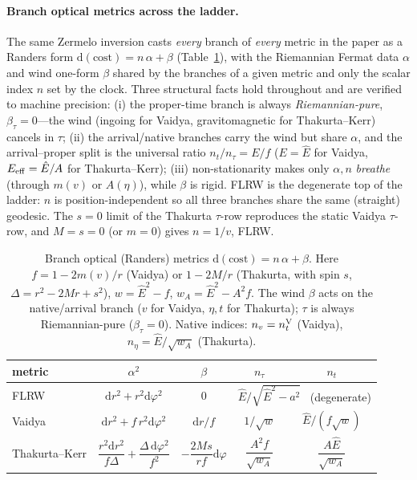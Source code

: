 \documentclass[12pt]{iopart}
\newcommand{\Ehat}{\hat E}
\newcommand{\dd}{\mathrm{d}}
\begin{document}
\paragraph{Branch optical metrics across the ladder.} The same Zermelo inversion
casts \emph{every} branch of \emph{every} metric in the paper as a Randers form
$\dd(\text{cost})=n\,\alpha+\beta$ (Table~\ref{tab:optical}), with the Riemannian
Fermat data $\alpha$ and wind one-form $\beta$ shared by the branches of a given
metric and only the scalar index $n$ set by the clock. Three structural facts
hold throughout and are verified to machine precision: (i) the proper-time branch
is always \emph{Riemannian-pure}, $\beta_\tau=0$---the wind (ingoing for Vaidya,
gravitomagnetic for Thakurta--Kerr) cancels in $\tau$; (ii) the arrival/native
branches carry the wind but share $\alpha$, and the arrival--proper split is the
universal ratio $n_t/n_\tau=E/f$ ($E=\Ehat$ for Vaidya, $E_{\rm eff}=\Ehat/A$ for
Thakurta--Kerr); (iii) non-stationarity makes only $\alpha,n$ \emph{breathe}
(through $m(v)$ or $A(\eta)$), while $\beta$ is rigid. FLRW is the degenerate top
of the ladder: $n$ is position-independent so all three branches share the same
(straight) geodesic. The $s=0$ limit of the Thakurta $\tau$-row reproduces the
static Vaidya $\tau$-row, and $M=s=0$ (or $m=0$) gives $n=1/v$, FLRW.

\begin{table}[ht]
    \centering
    \small
    \caption{Branch optical (Randers) metrics $\dd(\text{cost})=n\,\alpha+\beta$.
    Here $f=1-2m(v)/r$ (Vaidya) or $1-2M/r$ (Thakurta, with spin $s$,
    $\Delta=r^2-2Mr+s^2$), $w=\Ehat^2-f$, $w_A=\Ehat^2-A^2f$. The wind $\beta$
    acts on the native/arrival branch ($v$ for Vaidya, $\eta,t$ for Thakurta);
    $\tau$ is always Riemannian-pure ($\beta_\tau=0$). Native indices:
    $n_v=n_t^{\rm V}$ (Vaidya), $n_\eta=\Ehat/\sqrt{w_A}$ (Thakurta).}
    \label{tab:optical}
    \begin{tabular}{lcccc}
    \hline
    metric & $\alpha^2$ & $\beta$ & $n_\tau$ & $n_t$ \\
    \hline
    FLRW & $\dd r^2+r^2\dd\varphi^2$ & $0$
      & \multicolumn{2}{c}{$\Ehat/\sqrt{\Ehat^2-a^2}$ \ (degenerate)} \\[2pt]
    Vaidya & $\dd r^2+f\,r^2\dd\varphi^2$ & $\dd r/f$
      & $1/\sqrt{w}$ & $\Ehat/(f\sqrt{w})$ \\[2pt]
    Thakurta--Kerr
      & $\dfrac{r^2\dd r^2}{f\Delta}+\dfrac{\Delta\,\dd\varphi^2}{f^2}$
      & $-\dfrac{2Ms}{rf}\dd\varphi$
      & $\dfrac{A^2 f}{\sqrt{w_A}}$ & $\dfrac{A\Ehat}{\sqrt{w_A}}$ \\[3pt]
    \hline
    \end{tabular}
\end{table}
\end{document}
